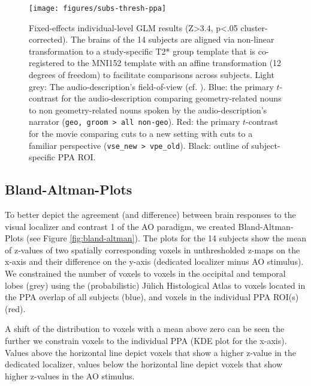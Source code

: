 \documentclass[english]{article}
\begin{document}
\begin{figure} \centering
    \texttt{[image: figures/subs-thresh-ppa]}
    \caption{Fixed-effects individual-level GLM results (Z>3.4, p<.05
        cluster-corrected). The brains of the 14 subjects are aligned via
        non-linear transformation to a study-specific T2* group template that is
    co-registered to the MNI152 template with an affine transformation (12
degrees of freedom) to facilitate comparisons across subjects.
        Light grey: The audio-description's field-of-view
        (cf. \citep{hanke2014audiomovie}).
        Blue: the primary $t$-contrast for the audio-description comparing
        geometry-related nouns to non geometry-related nouns spoken by the
        audio-description's narrator (\texttt{geo, groom > all non-geo}).
        Red: the primary $t$-contrast for the movie comparing cuts to a new
        setting with cuts to a familiar perspective (\texttt{vse\_new >
        vpe\_old}).
        Black: outline of subject-specific PPA ROI.}
\label{fig:subs-thresh-ppa}
\end{figure}


\subsection{Bland-Altman-Plots}
To better depict the agreement (and difference) between brain responses to the
visual localizer and contrast 1 of the AO paradigm, we created
Bland-Altman-Plots (see Figure \ref{fig:bland-altman}).
The plots for the 14 subjects show the mean of z-values of two spatially
corresponding voxels in unthresholded z-maps on the x-axis and their difference
on the y-axis (dedicated localizer minus AO stimulus).
We constrained the number of voxels to voxels in the occipital and temporal
lobes (grey) using the (probabilistic) Jülich Histological Atlas
\citep{eickhoff2005toolbox, eickhoff2007assignment} to voxels located in the
PPA overlap of all subjects (blue), and voxels in the individual PPA
ROI(s)(red).

A shift of the distribution to voxels with a mean above zero can be seen the
further we constrain voxels to the individual PPA (KDE plot for the x-axis).
Values above the horizontal line depict voxels that show a higher z-value in the
dedicated localizer, values below the horizontal line depict voxels that show
higher z-values in the AO stimulus.

\end{document}
